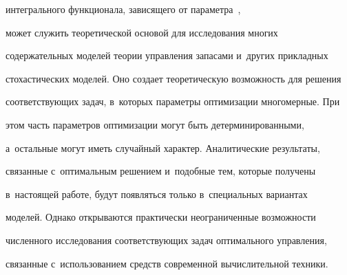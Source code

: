 интегрального функционала, зависящего от параметра~\cite{12-sh, 13-sh}, 

может служить теоретической основой для исследования многих 

содержательных моделей теории управ\-ле\-ния запасами и~других прикладных 

стохастических моделей. Оно создает теоретическую возможность для решения 

соответствующих задач, в~которых параметры оптимизации многомерные. При 

этом часть параметров оптимизации могут быть детерминированными, 

а~остальные могут иметь случайный характер. Аналитические результаты, 

связанные с~оптимальным решением и~подобные тем, которые получены 

в~настоящей работе, будут появляться только в~специальных вариантах 

моделей. Однако открываются практически неограниченные возможности 

численного исследования соответствующих задач оптимального управления, 

связанные с~использованием средств современной вычислительной техники.

  

